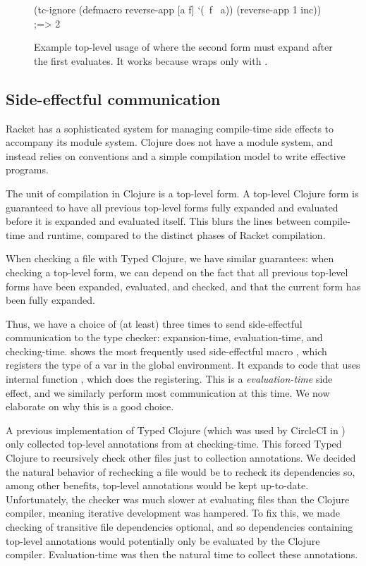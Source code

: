 \begin{figure}
\begin{cljlisting}
(tc-ignore
  (defmacro reverse-app [a f] `(~f ~a))
  (reverse-app 1 inc)) ;=> 2
\end{cljlisting}
  \caption{Example top-level usage of 
           where the second form must expand after the first evaluates.
  It works because  wraps only with .}
  \label{fig:analyzer:tc-ignore-usage}
\end{figure}

\subsection{Side-effectful communication}

Racket has a sophisticated system for managing compile-time side effects
to accompany its module system.
Clojure does not have a module system, and instead relies on conventions
and a simple compilation model to write effective programs.

The unit of compilation in Clojure is a top-level form. A top-level Clojure form
is guaranteed to have all previous top-level forms fully expanded
and evaluated before it is expanded and evaluated itself.
This blurs the lines between compile-time and runtime, compared to the
distinct phases of Racket compilation.

When checking a file with Typed Clojure, we have similar guarantees:
when checking a top-level form, we can depend on the fact that all
previous top-level forms have been expanded, evaluated, and checked,
and that the current form has been fully expanded.

Thus, we have a choice of (at least) three times to send side-effectful communication
to the type checker:
expansion-time, evaluation-time, and checking-time.
 shows the most frequently used
side-effectful macro , which registers the type of a var in the
global environment.
It expands to code that uses internal function , which does
the registering. This is a \emph{evaluation-time} side effect,
and we similarly perform most communication at this time.
We now elaborate on why this is a good choice.

A previous implementation of Typed Clojure (which was used by CircleCI
in ) only collected top-level annotations
from  at checking-time. This forced Typed Clojure to recursively
check other files just to collection annotations.
We decided the natural behavior of rechecking a file would be to
recheck its dependencies so, among other benefits, top-level annotations
would be kept up-to-date.
Unfortunately, the checker was much slower at evaluating files
than the Clojure compiler, meaning iterative development was hampered.
To fix this, we made checking of transitive file dependencies optional, and
so dependencies containing top-level annotations would potentially only 
be evaluated by the Clojure compiler.
Evaluation-time was then the natural time to collect these annotations.

